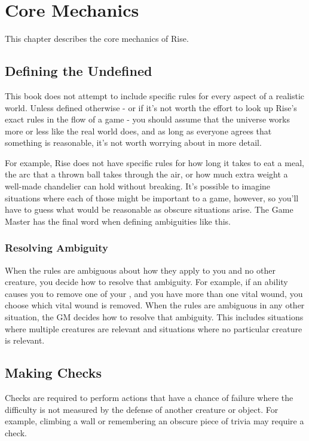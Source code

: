 \chapter{Core Mechanics}

This chapter describes the core mechanics of Rise.

\section{Defining the Undefined}
    This book does not attempt to include specific rules for every aspect of a realistic world.
    Unless defined otherwise - or if it's not worth the effort to look up Rise's exact rules in the flow of a game - you should assume that the universe works more or less like the real world does, and as long as everyone agrees that something is reasonable, it's not worth worrying about in more detail.

    For example, Rise does not have specific rules for how long it takes to eat a meal, the arc that a thrown ball takes through the air, or how much extra weight a well-made chandelier can hold without breaking.
    It's possible to imagine situations where each of those might be important to a game, however, so you'll have to guess what would be reasonable as obscure situations arise.
    The Game Master has the final word when defining ambiguities like this.

    \subsection{Resolving Ambiguity}\label{Resolving Ambiguity}
        When the rules are ambiguous about how they apply to you and no other creature, you decide how to resolve that ambiguity.
        For example, if an ability causes you to remove one of your , and you have more than one vital wound, you choose which vital wound is removed.
        When the rules are ambiguous in any other situation, the GM decides how to resolve that ambiguity.
        This includes situations where multiple creatures are relevant and situations where no particular creature is relevant.

\section{Making Checks}\label{Checks}\label{Making Checks}
    Checks are required to perform actions that have a chance of failure where the difficulty is not measured by the defense of another creature or object.
    For example, climbing a wall or remembering an obscure piece of trivia may require a check.

